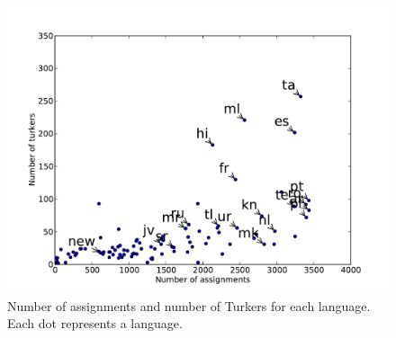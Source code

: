 \documentclass[11pt]{article}
\begin{document}

\begin{figure}[h]
\centering
\includegraphics[width=6in]{figures/assign-turk-scatter}
\caption{Number of assignments and number of Turkers for each language. Each dot represents a language.}
\label{ass-scatter}
\end{figure}
\end{document}
